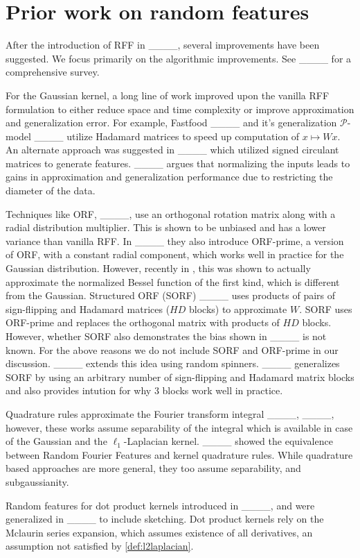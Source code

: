 \section{Prior work on random features}
After the introduction of RFF in ____, several improvements have been suggested. We focus primarily on the algorithmic improvements. See ____ for a comprehensive survey. 

For the Gaussian kernel, a long line of work improved upon the vanilla RFF formulation to either reduce space and time complexity or improve approximation and generalization error. For example, Fastfood ____ and it's generalization $\mathcal{P}$-model ____ utilize Hadamard matrices to speed up computation of $x\mapsto Wx$. An alternate approach was suggested in ____ which utilized signed circulant matrices to generate features. ____ argues that  normalizing the inputs leads to gains in approximation and generalization performance due to restricting the diameter of the data.

\begin{remark}
    Techniques like ORF, ____, use an orthogonal rotation matrix along with a radial distribution multiplier. This is shown to be unbiased and has a lower variance than vanilla RFF. In ____ they also introduce ORF-prime, a version of ORF, with a constant radial component, which works well in practice for the Gaussian distribution. However, recently in \cite[Thm. 2]{demni2024orthogonal}, this was shown to actually approximate the normalized Bessel function of the first kind, which is different from the Gaussian. Structured ORF (SORF) ____ uses products of pairs of sign-flipping and Hadamard matrices ($HD$ blocks) to approximate $W$. SORF uses ORF-prime and replaces the orthogonal matrix with products of $HD$ blocks. However, whether SORF also demonstrates the  bias shown in ____ is not known. For the above reasons we do not include SORF and ORF-prime in our discussion. ____ extends this idea using random spinners. ____ generalizes SORF by using an arbitrary number of sign-flipping and Hadamard matrix blocks and also provides intution for why 3 blocks work well in practice. 
\end{remark}

Quadrature rules approximate the Fourier transform integral ____, ____, however, these works assume separability of the integral which is available in case of the Gaussian and the $\ell_1$-Laplacian kernel. ____ showed the equivalence between Random Fourier Features and kernel quadrature rules. While quadrature based approaches are more general, they too assume separability, and subgaussianity. 

Random features for dot product kernels introduced 
in ____, and were generalized in ____ to include sketching. Dot product kernels rely on the Mclaurin series expansion, which assumes existence of all derivatives, an assumption not satisfied by \eqref{def:l2laplacian}.